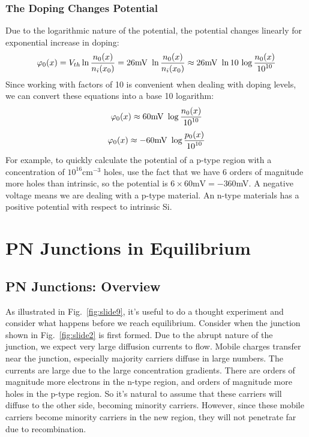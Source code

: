 \subsubsection{The Doping Changes Potential}
Due to the logarithmic nature of the potential, the potential changes linearly for exponential increase in doping:
\begin{equation} 
	{\varphi _0}(x) = {V_{th}}\ln \frac{{{n_0}(x)}}{{{n_i}({x_0})}} = 26{\rm{mV}}\,\,\ln \frac{{{n_0}(x)}}{{{n_i}({x_0})}} \approx 26{\rm{mV}}\,\,\ln 10\,\log \frac{{{n_0}(x)}}{{{{10}^{10}}}} 
\end{equation}
Since working with factors of 10 is convenient when dealing with doping levels, we can convert these equations into a base 10 logarithm:
\begin{equation} 
	{\varphi _0}(x) \approx 60{\rm{mV}}\,\,\log \frac{{{n_0}(x)}}{{{{10}^{10}}}} 
\end{equation}
\begin{equation} 
	{\varphi _0}(x) \approx  - 60{\rm{mV}}\,\,\log \frac{{{p_0}(x)}}{{{{10}^{10}}}} 
\end{equation}
For example, to quickly calculate the potential of a p-type region with a concentration of $10^{16} \mathrm{cm}^{-3}$ holes, use the fact that we have 6 orders of magnitude more holes than intrinsic, so the potential is $6 \times 60\mathrm{mV} = -360 $mV.  A negative voltage means we are dealing with a p-type material.  An n-type materials has a positive potential with respect to intrinsic Si.
\section{PN Junctions in Equilibrium}
\subsection{PN Junctions: Overview}
As illustrated in Fig.~\ref{fig:slide9}, it's useful to do a thought experiment and consider what happens before we reach equilibrium.  Consider when the junction shown in Fig.~\ref{fig:slide2}  is first formed.  Due to the abrupt nature of the junction, we expect very large diffusion currents to flow.   Mobile charges transfer near the junction, especially majority carriers diffuse in large numbers.  The currents are large due to the large concentration gradients.  There are orders of magnitude more electrons in the n-type region, and orders of magnitude more holes in the p-type region.  So it's natural to assume that these carriers will diffuse to the other side, becoming minority carriers.  However, since these mobile carriers become minority carriers in the new region, they will not penetrate far due to recombination.  

